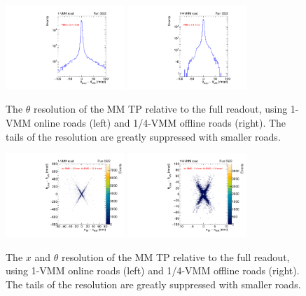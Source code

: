\begin{figure}[!htpb]
  \begin{center}
    \includegraphics[width=0.4\textwidth]{figures/gbtanalysis3522/TP_angres_full.pdf}
    \includegraphics[width=0.4\textwidth]{figures/gbtanalysis3522/TP_angres.pdf}
  \end{center}
  \vspace{-10pt}
  \caption{The $\theta$ resolution of the MM TP relative to the full readout, using 1-VMM online roads (left) and 1/4-VMM offline roads (right). The tails of the resolution are greatly suppressed with smaller roads.}
  \label{fig:thetares}
\end{figure}

\begin{figure}[!htpb]
  \begin{center}
    \includegraphics[width=0.4\textwidth]{figures/gbtanalysis3522/TP_xres_angres_full.pdf}
    \includegraphics[width=0.4\textwidth]{figures/gbtanalysis3522/TP_xres_angres.pdf}
  \end{center}
  \vspace{-10pt}
  \caption{The $x$ and $\theta$ resolution of the MM TP relative to the full readout, using 1-VMM online roads (left) and 1/4-VMM offline roads (right). The tails of the resolution are greatly suppressed with smaller roads.}
  \label{fig:xthetares}
\end{figure}


